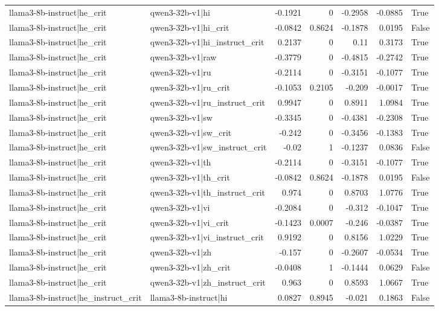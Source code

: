 \begin{table}
\begin{tabular}{l l r r r r l}
llama3-8b-instruct|he_crit & qwen3-32b-v1|hi & -0.1921 & 0 & -0.2958 & -0.0885 & True \\
llama3-8b-instruct|he_crit & qwen3-32b-v1|hi_crit & -0.0842 & 0.8624 & -0.1878 & 0.0195 & False \\
llama3-8b-instruct|he_crit & qwen3-32b-v1|hi_instruct_crit & 0.2137 & 0 & 0.11 & 0.3173 & True \\
llama3-8b-instruct|he_crit & qwen3-32b-v1|raw & -0.3779 & 0 & -0.4815 & -0.2742 & True \\
llama3-8b-instruct|he_crit & qwen3-32b-v1|ru & -0.2114 & 0 & -0.3151 & -0.1077 & True \\
llama3-8b-instruct|he_crit & qwen3-32b-v1|ru_crit & -0.1053 & 0.2105 & -0.209 & -0.0017 & True \\
llama3-8b-instruct|he_crit & qwen3-32b-v1|ru_instruct_crit & 0.9947 & 0 & 0.8911 & 1.0984 & True \\
llama3-8b-instruct|he_crit & qwen3-32b-v1|sw & -0.3345 & 0 & -0.4381 & -0.2308 & True \\
llama3-8b-instruct|he_crit & qwen3-32b-v1|sw_crit & -0.242 & 0 & -0.3456 & -0.1383 & True \\
llama3-8b-instruct|he_crit & qwen3-32b-v1|sw_instruct_crit & -0.02 & 1 & -0.1237 & 0.0836 & False \\
llama3-8b-instruct|he_crit & qwen3-32b-v1|th & -0.2114 & 0 & -0.3151 & -0.1077 & True \\
llama3-8b-instruct|he_crit & qwen3-32b-v1|th_crit & -0.0842 & 0.8624 & -0.1878 & 0.0195 & False \\
llama3-8b-instruct|he_crit & qwen3-32b-v1|th_instruct_crit & 0.974 & 0 & 0.8703 & 1.0776 & True \\
llama3-8b-instruct|he_crit & qwen3-32b-v1|vi & -0.2084 & 0 & -0.312 & -0.1047 & True \\
llama3-8b-instruct|he_crit & qwen3-32b-v1|vi_crit & -0.1423 & 0.0007 & -0.246 & -0.0387 & True \\
llama3-8b-instruct|he_crit & qwen3-32b-v1|vi_instruct_crit & 0.9192 & 0 & 0.8156 & 1.0229 & True \\
llama3-8b-instruct|he_crit & qwen3-32b-v1|zh & -0.157 & 0 & -0.2607 & -0.0534 & True \\
llama3-8b-instruct|he_crit & qwen3-32b-v1|zh_crit & -0.0408 & 1 & -0.1444 & 0.0629 & False \\
llama3-8b-instruct|he_crit & qwen3-32b-v1|zh_instruct_crit & 0.963 & 0 & 0.8593 & 1.0667 & True \\
llama3-8b-instruct|he_instruct_crit & llama3-8b-instruct|hi & 0.0827 & 0.8945 & -0.021 & 0.1863 & False \\

\end{tabular}
\end{table}
